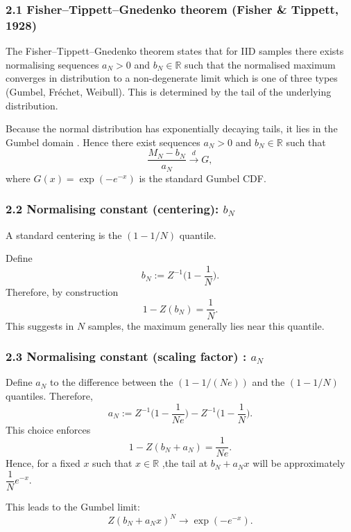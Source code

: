 \documentclass[
  12pt,
]{article}
\begin{document}
\subsubsection{2.1 Fisher--Tippett--Gnedenko theorem (Fisher \& Tippett,
1928)}\label{fishertippettgnedenko-theorem-fisher1928}

The Fisher--Tippett--Gnedenko theorem states that for IID samples there
exists normalising sequences \(a_N>0\) and \(b_N\in\mathbb{R}\) such
that the normalised maximum converges in distribution to a
non-degenerate limit which is one of three types (Gumbel, Fréchet,
Weibull). This is determined by the tail of the underlying distribution.

Because the normal distribution has exponentially decaying tails, it
lies in the Gumbel domain . Hence there exist sequences \(a_N>0\) and
\(b_N\in\mathbb{R}\) such that \[
\frac{M_N - b_N}{a_N} \xrightarrow{d} G \tag{1},
\] where \(G(x)=\exp(-e^{-x})\) is the standard Gumbel CDF.

\subsubsection{\texorpdfstring{2.2 Normalising constant (centering):
\(b_N\)}{2.2 Normalising constant (centering): b\_N}}\label{normalising-constant-centering-b_n}

A standard centering is the \((1-1/N)\) quantile.

Define \[
b_N := Z^{-1}\!\Big(1-\frac{1}{N}\Big) \tag{2}.
\] Therefore, by construction\[
1 - Z(b_N) = \frac{1}{N} \tag{3}.
\] This suggests in \(N\) samples, the maximum generally lies near this
quantile.

\subsubsection{\texorpdfstring{2.3 Normalising constant (scaling factor)
:
\(a_N\)}{2.3 Normalising constant (scaling factor) : a\_N}}\label{normalising-constant-scaling-factor-a_n}

Define \(a_N\) to the difference between the \((1-1/(Ne))\) and the
\((1-1/N)\) quantiles. Therefore,\[
a_N := Z^{-1}\!\Big(1-\frac{1}{Ne}\Big) - Z^{-1}\!\Big(1-\frac{1}{N}\Big) \tag{4}.
\] This choice enforces \[
1 - Z(b_N + a_N) = \frac{1}{Ne}.
\] Hence, for a fixed \(x\) such that \(x \in \mathbb{R}\) ,the tail at
\(b_N + a_N x\) will be approximately \(\dfrac{1}{N}e^{-x}\).

This leads to the Gumbel limit: \[
Z(b_N + a_N x)^N \longrightarrow \exp(-e^{-x}) \tag{5}.
\]
\end{document}
